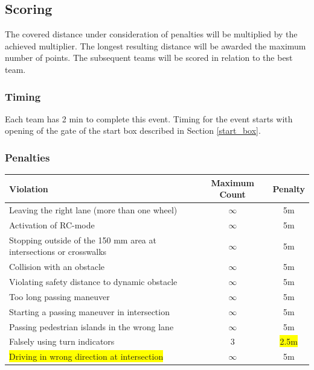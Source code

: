 \documentclass[a4paper]{report}
\begin{document}
{{\subsection{Scoring}
\label{obstacle_scoring}

The covered distance under consideration of penalties will be multiplied by the achieved multiplier. The longest resulting distance will be awarded the maximum number of points. The subsequent teams will be scored in relation to the best team. 

\subsubsection{Timing} 

Each team has 2 min to complete this event. Timing for the event starts with opening of the gate of the start box described in Section \ref{start_box}. 

\subsubsection{Penalties} 

\begin{table}[H]
\begin{tabular}{@{}lcc@{}}
\toprule
\textbf{Violation}                                                 & \textbf{Maximum Count} & \textbf{Penalty}\\ \midrule
Leaving the right lane (more than one wheel)                       & $\infty$               & 5m               \\
Activation of RC-mode                                              & $\infty$               & 5m               \\
Stopping outside of the 150 mm area at intersections or crosswalks & $\infty$               & 5m               \\
Collision with an obstacle                                         & $\infty$               & 5m               \\
Violating safety distance to dynamic obstacle                      & $\infty$               & 5m               \\
Too long passing maneuver                                          & $\infty$               & 5m               \\
Starting a passing maneuver in intersection                        & $\infty$               & 5m               \\
Passing pedestrian islands in the wrong lane                       & $\infty$               & 5m               \\
Falsely using turn indicators                                      & 3                      & \colorbox{yellow}{2.5m}                \\
\colorbox{yellow}{Driving in wrong direction at intersection}      & $\infty$               & 5m               \\ \bottomrule
\end{tabular}
\end{table}

}}
\end{document}
